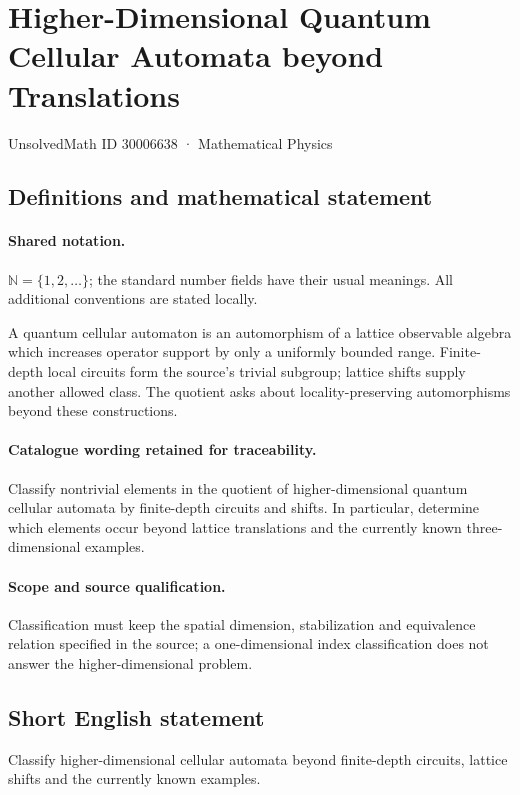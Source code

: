 \documentclass[11pt]{article}
\begin{document}
\setcounter{section}{30006637}
\section{Higher-Dimensional Quantum Cellular Automata beyond Translations}\label{30006638}
{\small UnsolvedMath ID 30006638 · Mathematical Physics}
\subsection{Definitions and mathematical statement}

\paragraph{Shared notation.}$\mathbb N=\{1,2,\ldots\}$; the standard number fields have their usual meanings. All additional conventions are stated locally.


A quantum cellular automaton is an automorphism of a lattice observable algebra which increases operator support by only a uniformly bounded range. Finite-depth local circuits form the source's trivial subgroup; lattice shifts supply another allowed class. The quotient asks about locality-preserving automorphisms beyond these constructions.

\paragraph{Catalogue wording retained for traceability.}
Classify nontrivial elements in the quotient of higher-dimensional quantum cellular automata by finite-depth circuits and shifts. In particular, determine which elements occur beyond lattice translations and the currently known three-dimensional examples.

\paragraph{Scope and source qualification.}Classification must keep the spatial dimension, stabilization and equivalence relation specified in the source; a one-dimensional index classification does not answer the higher-dimensional problem.
\subsection{Short English statement}
Classify higher-dimensional cellular automata beyond finite-depth circuits, lattice shifts and the currently known examples.
\end{document}
